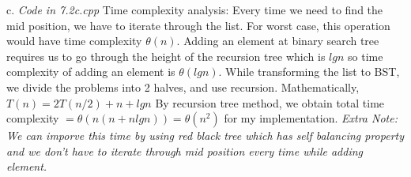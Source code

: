 \documentclass[a4paper,12pt]{article}
\begin{document}
{{c. \textit{ Code in 7.2c.cpp} \newline \newline
Time complexity analysis:\newline \newline
Every time we need to find the mid position, we have to iterate through the list. For worst case, this operation would have time complexity $\theta(n)$. Adding an element at binary search tree requires us to go through the height of the recursion tree which is $lgn$ so time complexity of adding an element is $\theta(lgn)$. While transforming the list to BST, we divide the problems into 2 halves, and use recursion. Mathematically,\newline \newline
$T(n) = 2 T(n/2) + n + lgn $\newline
By recursion tree method, we obtain total time complexity $=\theta(n(n + n lgn)) = \theta(n^2) $ for my implementation. 
\newline \newline \newline \textit{Extra Note: We can imporve this time by using red black tree which has self balancing property and we don't have to iterate through mid position every time while adding element.}  }}
\end{document}
